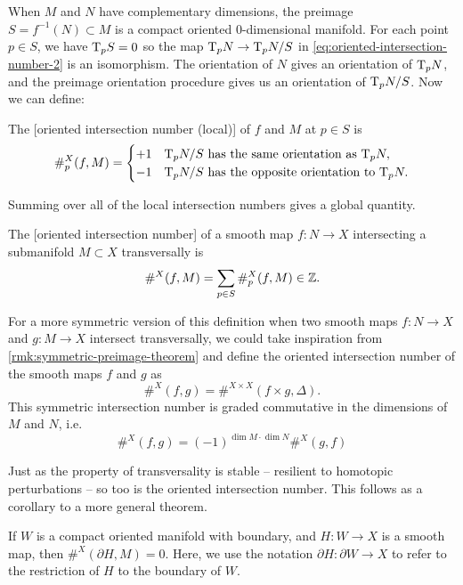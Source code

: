 When $M$ and $N$ have complementary dimensions, the preimage $S=f^{-1}(N)\subset M$ is a compact oriented $0$-dimensional manifold. For each point $p\in S$, we have $\mathrm{T}_p S=0$ so the map $\mathrm{T}_p N\to \mathrm{T}_p N/S$ in \cref{eq:oriented-intersection-number-2} is an isomorphism. The orientation of $N$ gives an orientation of $\mathrm{T}_p N$, and the preimage orientation procedure gives us an orientation of $\mathrm{T}_p N/S$. Now we can define:

\begin{definition}
	The [oriented intersection number (local)] of $f$ and $M$ at $p\in S$ is
	\[
		\#_p^X(f, M) = \begin{cases}
			+1 & \mathrm{T}_p N/S \textrm{ has the same orientation as } \mathrm{T}_p N,     \\
			-1 & \mathrm{T}_p N/S \textrm{ has the opposite orientation to } \mathrm{T}_p N.
		\end{cases}
	\]
\end{definition}
Summing over all of the local intersection numbers gives a global quantity.
\begin{definition}
	The [oriented intersection number] of a smooth map $f : N \to X$ intersecting a submanifold $M\subset X$ transversally is
	\[
		\#^X(f, M) = \sum_{p\in S} \#_p^X(f, M) \in \mathbb{Z}.
	\]
\end{definition}

\begin{remark}\label{rmk:symmetric-intersection-number}
	For a more symmetric version of this definition when two smooth maps $f : N \to X$ and $g : M \to X$ intersect transversally, we could take inspiration from \cref{rmk:symmetric-preimage-theorem} and define the oriented intersection number of the smooth maps $f$ and $g$ as
	\[
		\#^X(f,g) = \#^{X\times X}(f\times g, \Delta).
	\]
	This symmetric intersection number is graded commutative in the dimensions of $M$ and $N$, i.e.
	\begin{equation}\label{eq:intersection-number-graded-commutative}
		\#^X(f,g) = (-1)^{\dim M\cdot \dim N} \#^X(g,f)
	\end{equation}
\end{remark}

Just as the property of transversality is stable -- resilient to homotopic perturbations -- so too is the oriented intersection number. This follows as a corollary to a more general theorem.

\begin{theorem}
	If $W$ is a compact oriented manifold with boundary, and $H : W \to X$ is a smooth map, then $\#^X(\partial H, M)=0$. Here, we use the notation $\partial H : \partial W \to X$ to refer to the restriction of $H$ to the boundary of $W$.
\end{theorem}

